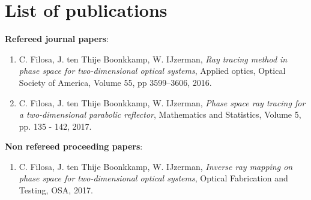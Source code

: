 \chapter*{List of publications}


\noindent \textbf{Refereed journal papers}:
\begin{enumerate}
\item   C. Filosa, J. ten Thije Boonkkamp, W. IJzerman,
\emph{Ray tracing method in phase space for two-dimensional optical systems}, Applied optics, Optical Society of America,
  Volume 55, pp 3599--3606, 2016.


\item  C. Filosa, J. ten Thije Boonkkamp, W. IJzerman, 
  \emph{Phase space ray tracing for a two-dimensional parabolic reflector},
Mathematics and Statistics, Volume 5, pp. 135 - 142, 2017.
\end{enumerate}
\noindent \textbf{Non refereed proceeding papers}:
\begin{enumerate}
\item 
  C. Filosa, J. ten Thije Boonkkamp, W. IJzerman,  \emph{Inverse ray mapping on phase space for two-dimensional optical systems},
  Optical Fabrication and Testing, OSA, 2017. 
\end{enumerate}
